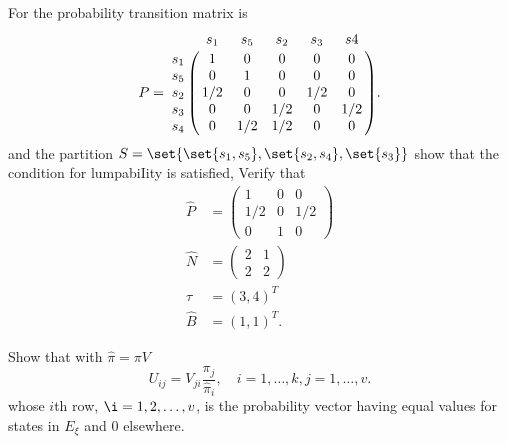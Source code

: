 \documentclass[12pt]{article}
\begin{document}
\begin{exercise}
    For the probability transition matrix is
    \[
        P = \bordermatrix{ & s_1 & s_5 & s_2 & s_3 & s4 \cr
        s_1 & 1 & 0 & 0 & 0 & 0 \cr
        s_5 & 0 & 1 & 0 & 0 & 0 \cr
        s_2 & 1/2 & 0 & 0 &1/2 & 0 \cr
        s_3 & 0 & 0 & 1/2 & 0 & 1/2 \cr
        s_4 & 0 & 1/2 & 1/2 & 0 & 0 \cr
        }.
    \] and the partition \( S = \set{ \set{s_1, s_5}, \set{s_2, s_4},
    \set{s_3}} \) show that the condition for lumpabiIity is satisfied,
    Verify that
    \begin{align*}
        \hat{P} &=
        \begin{pmatrix}
            1 & 0 & 0 \\
            1/2 & 0 & 1/2 \\
            0 & 1 & 0
        \end{pmatrix}
        \\
        \hat{N} &=
        \begin{pmatrix}
            2 & 1 \\
            2 & 2
        \end{pmatrix}
        \\
        \hat{\tau} &= (3, 4)^T \\
        \hat{B} &= (1,1)^T.
    \end{align*}
\end{exercise}
\begin{solution}

\end{solution}

\begin{exercise}
    Show that with \( \hat{\pi} = \pi V \)
    \[
        U_{ij} = V_{ji} \frac{\pi_j}{\hat{\pi}_{i}}, \quad i = 1, \dots,
        k, j = 1, \dots, v.
    \] whose \( i \)th row, \( \i = 1, 2, \dots, v \), is the
    probability vector having equal values for states in \( E_{\xi} \)
    and \( 0 \) elsewhere.
\end{exercise}
\begin{solution}

\end{solution}
\end{document}
